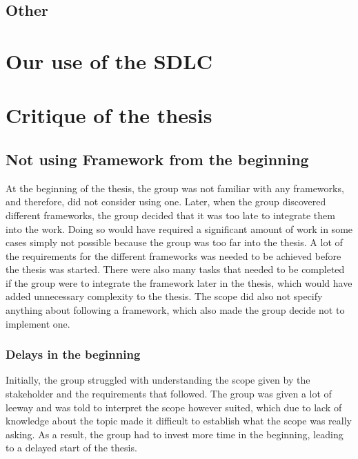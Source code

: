 \subsection{Other}

\section{Our use of the SDLC} %


\section{Critique of the thesis}

\subsection{Not using Framework from the beginning}
At the beginning of the thesis, the group was not familiar with any frameworks, and therefore, did not consider using one. Later, when the group discovered different frameworks, the group decided that it was too late to integrate them into the work. Doing so would have required a significant amount of work in some cases simply not possible because the group was too far into the thesis. A lot of the requirements for the different frameworks was needed to be achieved before the thesis was started. There were also many tasks that needed to be completed if the group were to integrate the framework later in the thesis, which would have added unnecessary complexity to the thesis. The scope did also not specify anything about following a framework, which also made the group decide not to implement one. 
\newpage
\subsubsection{Delays in the beginning}
Initially, the group struggled with understanding the scope given by the stakeholder and the requirements that followed. The group was given a lot of leeway and was told to interpret the scope however suited, which due to lack of knowledge about the topic made it difficult to establish what the scope was really asking. As a result, the group had to invest more time in the beginning, leading to a delayed start of the thesis. 

